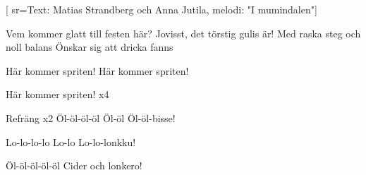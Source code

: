 [ 							
	sr={Text: Matias Strandberg och Anna Jutila, melodi: "I mumindalen"}]		
	
\beginverse*						
Vem kommer glatt till festen här?
Jovisst, det törstig gulis är!
Med raska steg och noll balans
Önskar sig att dricka fanns
\endverse						

\beginverse				
Här kommer spriten! 
Här kommer spriten!
\endverse				

\beginverse				
Här kommer spriten! x4
\endverse				

\beginverse				
Refräng x2
Öl-öl-öl-öl
Öl-öl
Öl-öl-bisse!
\endverse				

\beginverse				
Lo-lo-lo-lo
Lo-lo
Lo-lo-lonkku!
\endverse				

\beginverse				
Öl-öl-öl-öl-öl
Cider och lonkero!
\endverse				
\endsong	
